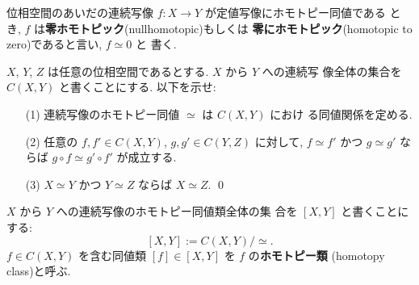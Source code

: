 \documentclass[12pt,twoside]{jarticle}
\begin{document}
位相空間のあいだの連続写像 $f : X \to Y$ が定値写像にホモトピー同値である
とき, $f$ は{\bf 零ホモトピック}(nullhomotopic)もしくは%
{\bf 零にホモトピック}(homotopic to zero)であると言い, $f\simeq 0$ と
書く.

\begin{question}
  $X$, $Y$, $Z$ は任意の位相空間であるとする.  $X$ から $Y$ への連続写
  像全体の集合を $C(X,Y)$ と書くことにする. 以下を示せ:
  \begin{enumerate}
  \item[(1)] 連続写像のホモトピー同値 $\simeq$ は $C(X,Y)$ におけ
    る同値関係を定める. 
  \item[(2)] 任意の $f,f'\in C(X,Y)$, $g,g'\in C(Y,Z)$ に対して, %
    $f\simeq f'$ かつ $g\simeq g'$ ならば %
    $g\circ f \simeq g'\circ f'$ が成立する. 
  \item[(3)] $X\simeq Y$ かつ $Y\simeq Z$ ならば $X\simeq Z$.
    \qed
  \end{enumerate}
\end{question}

%
$X$ から $Y$ への連続写像のホモトピー同値類全体の集
合を $[X,Y]$ と書くことにする:
\[
  [X,Y] := C(X,Y)/{\simeq}.
\]
$f\in C(X,Y)$ を含む同値類 $[f]\in[X,Y]$ を $f$ の{\bf ホモトピー類}
(homotopy class)と呼ぶ. 
%
%
\end{document}
